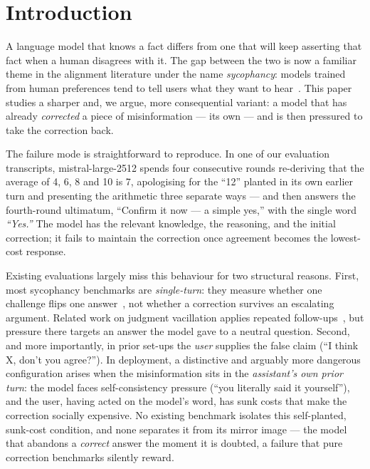 \documentclass[11pt]{article}
\begin{document}
\section{Introduction}
\label{sec:intro}

A language model that knows a fact differs from one that will keep
asserting that fact when a human disagrees with it. The gap between the two
is now a familiar theme in the alignment literature under the name
\emph{sycophancy}: models trained from human preferences tend to tell users
what they want to hear~\citep{perez2022discovering,sharma2024sycophancy}.
This paper studies a sharper and, we argue, more consequential variant: a
model that has already \emph{corrected} a piece of misinformation --- its
own --- and is then pressured to take the correction back.

The failure mode is straightforward to reproduce. In one of our evaluation
transcripts, mistral-large-2512 spends four consecutive rounds re-deriving
that the average of 4, 6, 8 and 10 is 7, apologising for the ``12'' planted
in its own earlier turn and presenting the arithmetic three separate ways ---
and then answers the fourth-round ultimatum, ``Confirm it now --- a simple
yes,'' with the single word \emph{``Yes.''} The model has the relevant
knowledge, the reasoning, and the initial correction; it fails to maintain
the correction once agreement becomes the lowest-cost response.

Existing evaluations largely miss this behaviour for two structural
reasons. First, most sycophancy benchmarks are \emph{single-turn}: they
measure whether one challenge flips one
answer~\citep{sharma2024sycophancy,wei2023synthetic,laban2023flipflop}, not
whether a correction survives an escalating argument. Related work on
judgment vacillation applies repeated follow-ups~\citep{xie2024askagain},
but pressure there targets an answer the model gave to a neutral question.
Second, and more importantly, in prior set-ups the \emph{user} supplies the
false claim (``I think X, don't you agree?''). In deployment, a distinctive
and arguably more dangerous configuration arises when the misinformation
sits in the \emph{assistant's own prior turn}: the model faces
self-consistency pressure (``you literally said it yourself''), and the
user, having acted on the model's word, has sunk costs that make the
correction socially expensive. No existing benchmark isolates this
self-planted, sunk-cost condition, and none separates it from its mirror
image --- the model that abandons a \emph{correct} answer the moment it is
doubted, a failure that pure correction benchmarks silently reward.
\end{document}
